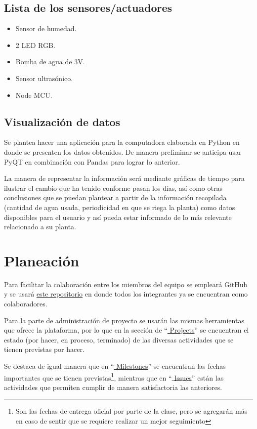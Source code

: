 \documentclass[12pt]{article}
\begin{document}
\subsection{Lista de los sensores/actuadores}
\begin{itemize}
\item Sensor de humedad.
\item 2 LED RGB.
\item Bomba de agua de 3V.
\item Sensor ultrasónico.
\item Node MCU.
\end{itemize}

\subsection{Visualización de datos}
Se plantea hacer una aplicación para la computadora
elaborada en Python en donde se presenten los datos
obtenidos. De manera preliminar se anticipa usar PyQT en
combinación con Pandas para lograr lo anterior.

La manera de representar la información será mediante
gráficas de tiempo para ilustrar el cambio que ha tenido
conforme pasan los días, así como otras conclusiones que se
puedan plantear a partir de la información recopilada 
(cantidad de agua usada, periodicidad en que se riega la
planta) como datos disponibles para el usuario y así pueda
estar informado de lo más relevante relacionado a su planta.

\section{Planeación}
Para facilitar la colaboración entre los miembros del
equipo se empleará GitHub y se usará
\href{https://github.com/axelgio01/TC1004B.8}{este
repositorio} en donde todos los integrantes ya se
encuentran como colaboradores.

Para la parte de administración de proyecto se usarán las
mismas herramientas que ofrece la plataforma, por lo que
en la sección de
``\href{https://github.com/axelgio01/TC1004B.8/projects/1}{
Projects}'' se encuentran el estado (por hacer, en proceso,
terminado) de las diversas actividades que se tienen
previstas por hacer.

Se destaca de igual manera que en
``\href{https://github.com/axelgio01/TC1004B.8/milestones}{
Milestones}'' se encuentran las fechas importantes que
se tienen previstas\footnote{Son las fechas de entrega
oficial por parte de la clase, pero se agregarán más en caso
de sentir que se requiere realizar un mejor seguimiento},
mientras que en
``\href{https://github.com/axelgio01/TC1004B.8/issues}{
Issues}'' están las actividades que permiten cumplir de
manera satisfactoria las anteriores.
\end{document}
